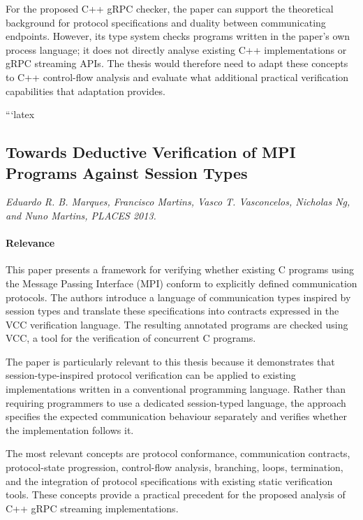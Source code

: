 For the proposed C++ gRPC checker, the paper can support the theoretical background
for protocol specifications and duality between communicating endpoints. However,
its type system checks programs written in the paper's own process language; it does
not directly analyse existing C++ implementations or gRPC streaming APIs. The thesis
would therefore need to adapt these concepts to C++ control-flow analysis and evaluate
what additional practical verification capabilities that adaptation provides.


```latex
\subsection{Towards Deductive Verification of MPI Programs Against Session Types}
\textit{Eduardo R. B. Marques, Francisco Martins, Vasco T. Vasconcelos, Nicholas Ng, and Nuno Martins, PLACES 2013.}

\paragraph{Relevance}
This paper presents a framework for verifying whether existing C programs using the Message Passing Interface (MPI) conform to explicitly defined communication protocols. The authors introduce a language of communication types inspired by session types and translate these specifications into contracts expressed in the VCC verification language. The resulting annotated programs are checked using VCC, a tool for the verification of concurrent C programs.

The paper is particularly relevant to this thesis because it demonstrates that session-type-inspired protocol verification can be applied to existing implementations written in a conventional programming language. Rather than requiring programmers to use a dedicated session-typed language, the approach specifies the expected communication behaviour separately and verifies whether the implementation follows it.

The most relevant concepts are protocol conformance, communication contracts, protocol-state progression, control-flow analysis, branching, loops, termination, and the integration of protocol specifications with existing static verification tools. These concepts provide a practical precedent for the proposed analysis of C++ gRPC streaming implementations.

